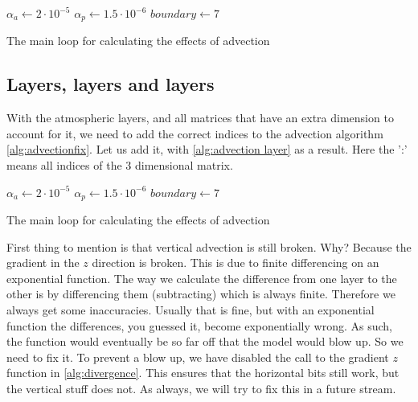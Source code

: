 \begin{algorithm}
    $\alpha_a \leftarrow 2 \cdot 10^{-5}$ \;
    $\alpha_p \leftarrow 1.5 \cdot 10^{-6}$ \;
    $boundary \leftarrow 7$ \;
    \caption{The main loop for calculating the effects of advection}
    \label{alg:advectionfix}
\end{algorithm}

\subsection{Layers, layers and layers}
With the atmospheric layers, and all matrices that have an extra dimension to account for it, we need to add the correct indices to the advection algorithm \autoref{alg:advectionfix}. Let us 
add it, with \autoref{alg:advection layer} as a result. Here the ':' means all indices of the 3 dimensional matrix. 

\begin{algorithm}
    $\alpha_a \leftarrow 2 \cdot 10^{-5}$ \;
    $\alpha_p \leftarrow 1.5 \cdot 10^{-6}$ \;
    $boundary \leftarrow 7$ \;
    \caption{The main loop for calculating the effects of advection}
    \label{alg:advection layer}
\end{algorithm}

First thing to mention is that vertical advection is still broken. Why? Because the gradient in the $z$ direction is broken. This is due to finite differencing on an exponential function. The way
we calculate the difference from one layer to the other is by differencing them (subtracting) which is always finite. Therefore we always get some inaccuracies. Usually that is fine, but with an 
exponential function the differences, you guessed it, become exponentially wrong. As such, the function would eventually be so far off that the model would blow up. So we need to fix it. To 
prevent a blow up, we have disabled the call to the gradient $z$ function in \autoref{alg:divergence}. This ensures that the horizontal bits still work, but the vertical stuff does not.
As always, we will try to fix this in a future stream. 